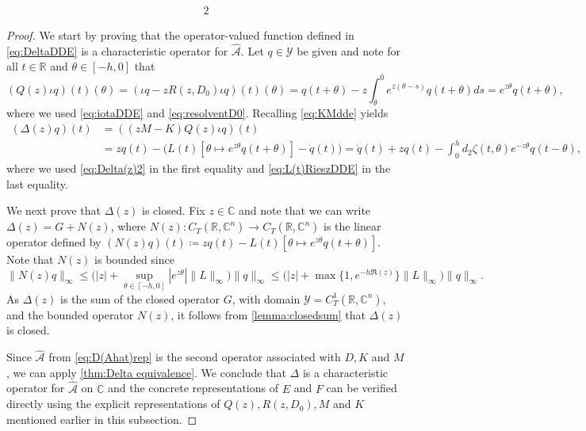 \documentclass[english]{myarticle}
\begin{document}
\begin{sloppypar}
\begin{theorem}
\begin{alignat*}{2}
 \end{alignat*}
\end{theorem}
\begin{proof}
We start by proving that the operator-valued function defined in \eqref{eq:DeltaDDE} is a characteristic operator for $\hat{\mathcal{A}}$. Let $q \in \mathcal{Y}$ be given and note for all $t \in \mathbb{R}$ and $\theta \in [-h,0]$ that
\begin{equation} \label{eq:Q(z)DDE}
    (Q(z)\iota q)(t)(\theta) = (\iota q - zR(z,D_0) \iota q)(t)(\theta) 
    = q(t+\theta) - z \int_{\theta}^0 e^{z (\theta-s)} q(t+\theta) ds = e^{z \theta}q(t+\theta),
\end{equation}
where we used \eqref{eq:iotaDDE} and \eqref{eq:resolventD0}. Recalling \eqref{eq:KMdde} yields
\begin{align*}
    (\Delta(z)q)(t) &= ((zM-K)Q(z)\iota q)(t) \\
    &= zq(t) -  \bigg( L(t)[\theta \mapsto e^{z \theta} q(t+\theta)] - \dot{q}(t) \bigg) = \dot{q}(t) + zq(t) - \int_0^h d_2 \zeta(t,\theta) e^{- z \theta} q(t-\theta),
\end{align*}
where we used \eqref{eq:Delta(z)2} in the first equality and \eqref{eq:L(t)RieszDDE} in the last equality. 

We next prove that $\Delta(z)$ is closed. Fix $z \in \mathbb{C}$ and note that we can write $\Delta(z) = G + N(z)$, where $N(z) : C_T(\mathbb{R},\mathbb{C}^n) \to C_T(\mathbb{R},\mathbb{C}^n) $ is the linear operator defined by $(N(z)q)(t) \coloneqq zq(t) - L(t)[\theta \mapsto e^{z \theta}q(t+\theta)]$. Note that $N(z)$ is bounded since
\begin{equation*}
    \|N(z)q\|_{\infty} \leq \big(|z| + \sup_{\theta \in [-h,0]} |e^{z\theta}| \|L\|_\infty \big)  \| q \|_{\infty} \leq \big( |z| + \max\{1,e^{-h \Re (z)} \} \|L\|_\infty  \big) \| q \|_{\infty}.
\end{equation*}
As $\Delta(z)$ is the sum of the closed operator $G$, with domain $\mathcal{Y} = C_T^1(\mathbb{R},\mathbb{C}^n)$, and the bounded operator $N(z)$, it follows from \cref{lemma:closedsum} that $\Delta(z)$ is closed.

Since $\hat{\mathcal{A}}$ from \eqref{eq:D(Ahat)rep} is the second operator associated with $D,K$ and $M$, we can apply \cref{thm:Delta equivalence}. We conclude that $\Delta$ is a characteristic operator for $\hat{\mathcal{A}}$ on $\mathbb{C}$ and the concrete representations of $E$ and $F$ can be verified directly using the explicit representations of $Q(z), R(z,D_0), M$ and $K$ mentioned earlier in this subsection.


\end{proof}
\end{sloppypar}
\end{document}

